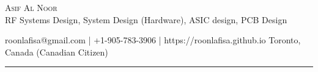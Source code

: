 \documentclass[10pt, Letter]{article}
\newcommand{\metasection}[2]
{
\footnotesize{#2} \hspace*{\fill} \footnotesize{#1}\\[1pt]
}
\begin{document}
\pagestyle{fancy}	








\vspace{-8pt}
\begin{center}
	\huge \textsc{Asif Al Noor} \\[2pt]
	\small RF Systems Design, System Design (Hardware), ASIC design, PCB Design
\end{center}



\vspace{6pt}


\vspace{-10pt}
\metasection{Toronto, Canada (Canadian Citizen)}{roonlafisa@gmail.com | +1-905-783-3906 | https://roonlafisa.github.io}
\vspace{-6pt}
\textcolor{softcol}{\hrule}


\normalsize

\end{document}
